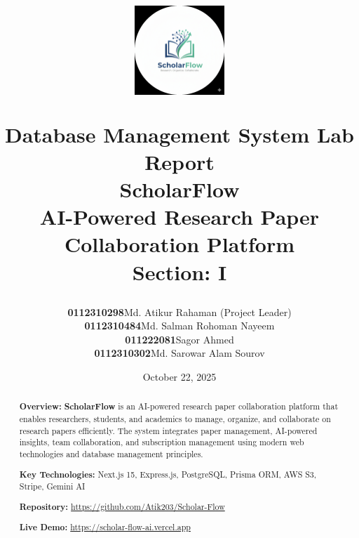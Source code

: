 \documentclass[12pt,a4paper]{report}
\title{
    \vspace{-2cm}
    \begin{figure}[h]
    \centering
    \includegraphics[width=0.3\textwidth]{images/logos/logo.png}
    \end{figure}
    \vspace{0.3cm}
    {\Large\textbf{Database Management System Lab Report}}\\
    \vspace{0.4cm}
    {\LARGE\textcolor{primaryblue}{\textbf{ScholarFlow}}}\\
    \vspace{0.3cm}
    {\large AI-Powered Research Paper Collaboration Platform}\\
    \vspace{0.5cm}
    {\normalsize\textbf{Section: I}}
}
\author{
    \begin{tabular}{rl}
    \textbf{0112310298} & Md. Atikur Rahaman (Project Leader) \\
    \textbf{0112310484} & Md. Salman Rohoman Nayeem \\
    \textbf{011222081} & Sagor Ahmed \\
    \textbf{0112310302} & Md. Sarowar Alam Sourov \\
    \end{tabular}
}
\date{October 22, 2025}
\newcommand{\projectname}{\textbf{\textcolor{primaryblue}{ScholarFlow}}}
\begin{document}
\maketitle
\thispagestyle{empty}

\newpage

\begin{abstract}
\noindent
\textbf{Overview:} \projectname{} is an AI-powered research paper collaboration platform that enables researchers, students, and academics to manage, organize, and collaborate on research papers efficiently. The system integrates paper management, AI-powered insights, team collaboration, and subscription management using modern web technologies and database management principles.

\vspace{0.3cm}
\noindent
\textbf{Key Technologies:} Next.js 15, Express.js, PostgreSQL, Prisma ORM, AWS S3, Stripe, Gemini AI

\vspace{0.3cm}
\noindent
\textbf{Repository:} \url{https://github.com/Atik203/Scholar-Flow}

\vspace{0.3cm}
\noindent
\textbf{Live Demo:} \url{https://scholar-flow-ai.vercel.app}
\end{abstract}

\newpage

\tableofcontents
\newpage
















\end{document}
